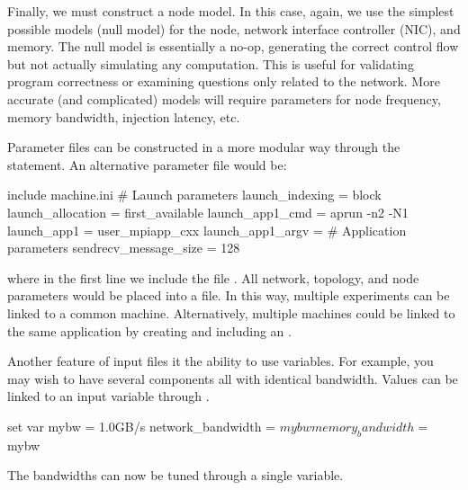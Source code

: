 Finally, we must construct a node model.  
In this case, again, we use the simplest possible models (null model) for the node, 
network interface controller (NIC), and memory.  
The null model is essentially a no-op, generating the correct control flow but not actually simulating any computation. 
This is useful for validating program correctness or examining questions only related to the network.  
More accurate (and complicated) models will require parameters for node frequency, memory bandwidth, injection latency, etc.

Parameter files can be constructed in a more modular way through the  statement.  
An alternative parameter file would be:

\begin{ViFile}
include machine.ini
# Launch parameters
launch_indexing = block
launch_allocation = first_available
launch_app1_cmd = aprun -n2 -N1
launch_app1 = user_mpiapp_cxx
launch_app1_argv = 
# Application parameters
sendrecv_message_size = 128
\end{ViFile}
where in the first line we include the file .  
All network, topology, and node parameters would be placed into a  file.  
In this way, multiple experiments can be linked to a common machine.  
Alternatively, multiple machines could be linked to the same application by creating and including an .

Another feature of input files it the ability to use variables.
For example, you may wish to have several components all with identical bandwidth.
Values can be linked to an input variable through .

\begin{ViFile}
set var mybw = 1.0GB/s
network_bandwidth = $mybw
memory_bandwidth = $mybw
\end{ViFile}
The bandwidths can now be tuned through a single variable.

